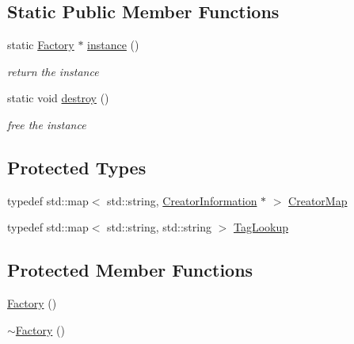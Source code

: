 \subsection*{Static Public Member Functions}
\begin{DoxyCompactItemize}
\item 
static \mbox{\hyperlink{classg2o_1_1_factory}{Factory}} $\ast$ \mbox{\hyperlink{classg2o_1_1_factory_a8a1f33e017c5ad59399cef48972578ae}{instance}} ()
\begin{DoxyCompactList}\small\item\em return the instance \end{DoxyCompactList}\item 
static void \mbox{\hyperlink{classg2o_1_1_factory_ab40f0aa18dabb91a35de7186ede9355a}{destroy}} ()
\begin{DoxyCompactList}\small\item\em free the instance \end{DoxyCompactList}\end{DoxyCompactItemize}
\subsection*{Protected Types}
\begin{DoxyCompactItemize}
\item 
typedef std\+::map$<$ std\+::string, \mbox{\hyperlink{classg2o_1_1_factory_1_1_creator_information}{Creator\+Information}} $\ast$ $>$ \mbox{\hyperlink{classg2o_1_1_factory_a639c8d850892dddc20098e9aa97ef9e8}{Creator\+Map}}
\item 
typedef std\+::map$<$ std\+::string, std\+::string $>$ \mbox{\hyperlink{classg2o_1_1_factory_aba274179c053b3b71dcef6a20c898496}{Tag\+Lookup}}
\end{DoxyCompactItemize}
\subsection*{Protected Member Functions}
\begin{DoxyCompactItemize}
\item 
\mbox{\hyperlink{classg2o_1_1_factory_af8b5afc514363e6f00c61e8acd67b495}{Factory}} ()
\item 
\mbox{\hyperlink{classg2o_1_1_factory_a4b7c6970f55045ee632e6276387d0223}{$\sim$\+Factory}} ()
\end{DoxyCompactItemize}
